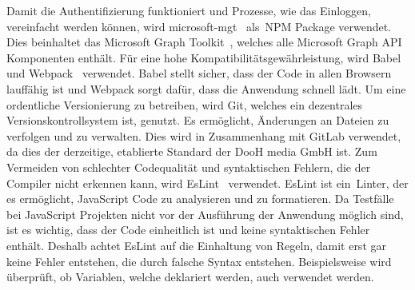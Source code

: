 \newline
Damit die Authentifizierung funktioniert und Prozesse, wie das Einloggen, vereinfacht werden können, wird microsoft-mgt~\cite{Microsoft-mgt-npm} als~\gls{NPM} Package verwendet.
Dies beinhaltet das Microsoft Graph Toolkit~\cite{Microsoft-Graph-Toolkit}, welches alle Microsoft Graph API Komponenten enthält.
\newline
Für eine hohe Kompatibilitätsgewährleistung, wird Babel~\cite{Babel} und Webpack~\cite{Webpack} verwendet.
Babel stellt sicher, dass der Code in allen Browsern lauffähig ist und Webpack sorgt dafür, dass die Anwendung schnell lädt.
\newline
Um eine ordentliche Versionierung zu betreiben, wird Git, welches ein dezentrales Versionskontrollsystem ist, genutzt.
Es ermöglicht, Änderungen an Dateien zu verfolgen und zu verwalten.
Dies wird in Zusammenhang mit GitLab verwendet, da dies der derzeitige, etablierte Standard der DooH media GmbH ist.
\newline
{}
Zum Vermeiden von schlechter Codequalität und syntaktischen Fehlern, die der Compiler nicht erkennen kann, wird EsLint~\cite{EsLint} verwendet.
EsLint ist ein~\gls{Linter}, der es ermöglicht, JavaScript Code zu analysieren und zu formatieren.
Da Testfälle bei JavaScript Projekten nicht vor der Ausführung der Anwendung möglich sind, ist es wichtig, dass der Code einheitlich ist und keine syntaktischen Fehler enthält.
Deshalb achtet EsLint auf die Einhaltung von Regeln, damit erst gar keine Fehler entstehen, die durch falsche Syntax entstehen.
Beispielsweise wird überprüft, ob Variablen, welche deklariert werden, auch verwendet werden.
\newline
\newline
